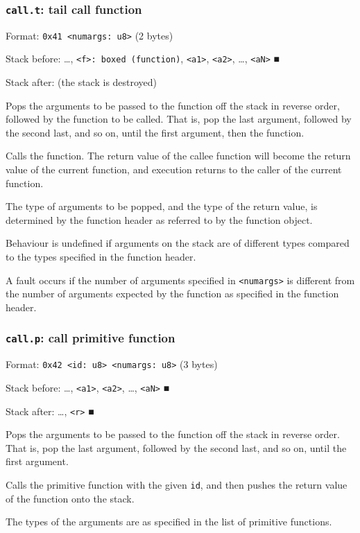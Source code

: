 \documentclass[11pt]{article}
\begin{document}
\subsubsection{\texttt{call.t}: tail call function}
\label{sec:org026b562}
Format: \texttt{0x41 <numargs: u8>} (2 bytes)

Stack before: \ldots{}​, \texttt{<f>: boxed (function)}, \texttt{<a1>}, \texttt{<a2>}, \ldots{}​,
\texttt{<aN>} ■

Stack after: (the stack is destroyed)

Pops the arguments to be passed to the function off the stack in reverse
order, followed by the function to be called. That is, pop the last
argument, followed by the second last, and so on, until the first
argument, then the function.

Calls the function. The return value of the callee function will become
the return value of the current function, and execution returns to the
caller of the current function.

The type of arguments to be popped, and the type of the return value, is
determined by the function header as referred to by the function object.

Behaviour is undefined if arguments on the stack are of different types
compared to the types specified in the function header.

A fault occurs if the number of arguments specified in \texttt{<numargs>} is
different from the number of arguments expected by the function as
specified in the function header.

\subsubsection{\texttt{call.p}: call primitive function}
\label{sec:org99bb90f}
Format: \texttt{0x42 <id: u8> <numargs: u8>} (3 bytes)

Stack before: \ldots{}​, \texttt{<a1>}, \texttt{<a2>}, \ldots{}​, \texttt{<aN>} ■

Stack after: \ldots{}​, \texttt{<r>} ■

Pops the arguments to be passed to the function off the stack in reverse
order. That is, pop the last argument, followed by the second last, and
so on, until the first argument.

Calls the primitive function with the given \texttt{id}, and then pushes the
return value of the function onto the stack.

The types of the arguments are as specified in the list of primitive
functions.
\end{document}
